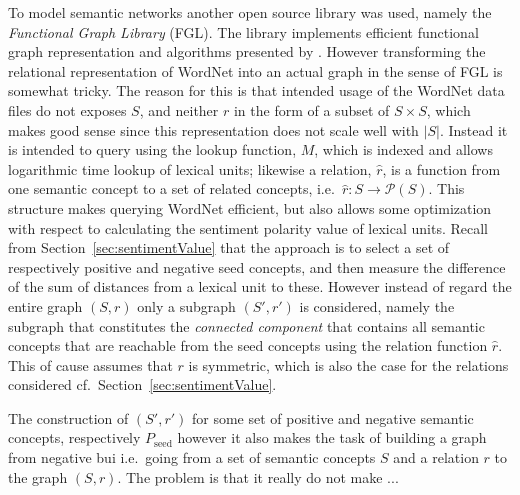To model semantic networks another open source library was used, namely the \emph{Functional Graph Library} (FGL). The library implements efficient functional graph representation and algorithms presented by \citeauthor{fgl} . However transforming the relational representation of WordNet into an actual graph in the sense of FGL is somewhat tricky. The reason for this is that intended usage of the WordNet data files do not exposes $S$, and neither $r$ in the form of a subset of $S \times S$, which makes good sense since this representation does not scale well with $|S|$. Instead it is intended to query using the lookup function, $M$, which is indexed and allows logarithmic time lookup of lexical units; likewise a relation, $\hat{r}$, is a function from one semantic concept to a set of related concepts, i.e.\ $\hat{r}: S \to \mathcal{P}(S)$. This structure makes querying WordNet efficient, but also allows some optimization with respect to calculating the sentiment polarity value of lexical units. Recall from Section~\ref{sec:sentimentValue} that the approach is to select a set of respectively positive and negative seed concepts, and then measure the difference of the sum of distances from a lexical unit to these. However instead of regard the entire graph $(S, r)$ only a subgraph $(S', r')$ is considered, namely the subgraph that constitutes the \emph{connected component} that contains all semantic concepts that are reachable from the seed concepts using the relation function $\hat{r}$. This of cause assumes that $r$ is symmetric, which is also the case for the relations considered cf.\ Section~\ref{sec:sentimentValue}.

The construction of $(S', r')$ for some set of positive and negative semantic concepts, respectively $P_\mathrm{seed}$ however it also makes the task of building a graph from negative  bui i.e.\ going from a set of semantic concepts $S$ and a relation $r$ to the graph $(S, r)$. The problem is that it really do not make ...  


